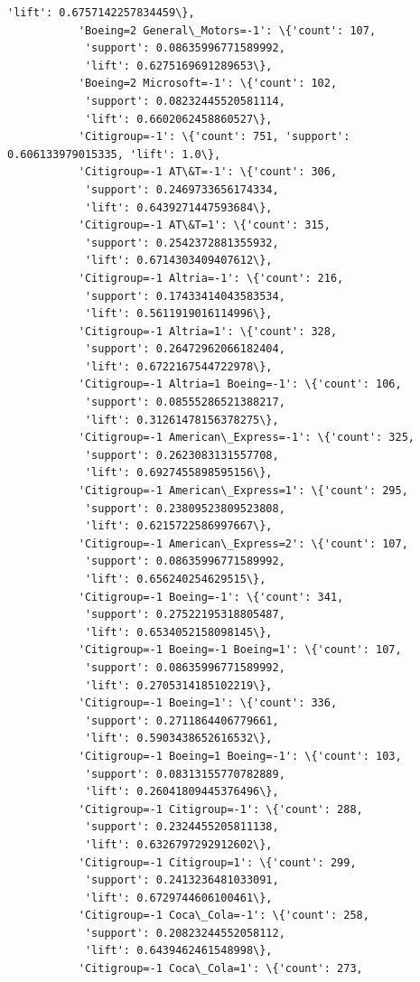 \documentclass[11pt]{article}
\begin{document}
\begin{Verbatim}[commandchars=\\\{\}]
            'lift': 0.6757142257834459\},
           'Boeing=2 General\_Motors=-1': \{'count': 107,
            'support': 0.08635996771589992,
            'lift': 0.6275169691289653\},
           'Boeing=2 Microsoft=-1': \{'count': 102,
            'support': 0.08232445520581114,
            'lift': 0.6602062458860527\},
           'Citigroup=-1': \{'count': 751, 'support': 0.606133979015335, 'lift': 1.0\},
           'Citigroup=-1 AT\&T=-1': \{'count': 306,
            'support': 0.2469733656174334,
            'lift': 0.6439271447593684\},
           'Citigroup=-1 AT\&T=1': \{'count': 315,
            'support': 0.2542372881355932,
            'lift': 0.6714303409407612\},
           'Citigroup=-1 Altria=-1': \{'count': 216,
            'support': 0.17433414043583534,
            'lift': 0.5611919016114996\},
           'Citigroup=-1 Altria=1': \{'count': 328,
            'support': 0.26472962066182404,
            'lift': 0.6722167544722978\},
           'Citigroup=-1 Altria=1 Boeing=-1': \{'count': 106,
            'support': 0.08555286521388217,
            'lift': 0.31261478156378275\},
           'Citigroup=-1 American\_Express=-1': \{'count': 325,
            'support': 0.2623083131557708,
            'lift': 0.6927455898595156\},
           'Citigroup=-1 American\_Express=1': \{'count': 295,
            'support': 0.23809523809523808,
            'lift': 0.6215722586997667\},
           'Citigroup=-1 American\_Express=2': \{'count': 107,
            'support': 0.08635996771589992,
            'lift': 0.656240254629515\},
           'Citigroup=-1 Boeing=-1': \{'count': 341,
            'support': 0.27522195318805487,
            'lift': 0.6534052158098145\},
           'Citigroup=-1 Boeing=-1 Boeing=1': \{'count': 107,
            'support': 0.08635996771589992,
            'lift': 0.2705314185102219\},
           'Citigroup=-1 Boeing=1': \{'count': 336,
            'support': 0.2711864406779661,
            'lift': 0.5903438652616532\},
           'Citigroup=-1 Boeing=1 Boeing=-1': \{'count': 103,
            'support': 0.08313155770782889,
            'lift': 0.26041809445376496\},
           'Citigroup=-1 Citigroup=-1': \{'count': 288,
            'support': 0.2324455205811138,
            'lift': 0.6326797292912602\},
           'Citigroup=-1 Citigroup=1': \{'count': 299,
            'support': 0.2413236481033091,
            'lift': 0.6729744606100461\},
           'Citigroup=-1 Coca\_Cola=-1': \{'count': 258,
            'support': 0.20823244552058112,
            'lift': 0.6439462461548998\},
           'Citigroup=-1 Coca\_Cola=1': \{'count': 273,

\end{Verbatim}
\end{document}
